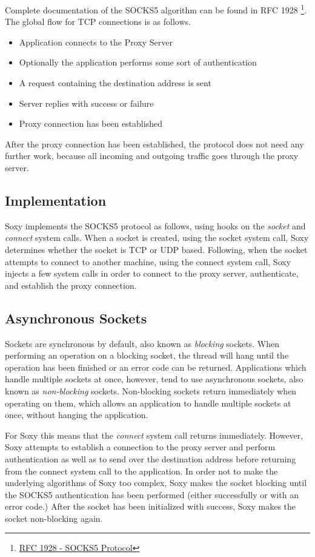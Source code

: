 \documentclass[a4paper, 10pt]{report}
\begin{document}
Complete documentation of the SOCKS5 algorithm can be found in
RFC 1928 \footnote{\href{http://www.ietf.org/rfc/rfc1928.txt}
{RFC 1928 - SOCKS5 Protocol}}. The global flow for TCP connections
is as follows.

\begin{itemize}
\item Application connects to the Proxy Server
\item Optionally the application performs some sort of authentication
\item A request containing the destination address is sent
\item Server replies with success or failure
\item Proxy connection has been established
\end{itemize}

After the proxy connection has been established, the protocol does not need
any further work, because all incoming and outgoing traffic goes through the
proxy server.

\subsection{Implementation}

Soxy implements the SOCKS5 protocol as follows, using hooks on the
\textit{socket} and \textit{connect} system calls. When a
socket is created, using the socket system call, Soxy determines whether the
socket is TCP or UDP based. Following, when the socket attempts to connect to
another machine, using the connect system call, Soxy injects a few system
calls in order to connect to the proxy server, authenticate, and establish the
proxy connection.

\subsection{Asynchronous Sockets}

Sockets are synchronous by default, also known as \textit{blocking} sockets.
When performing an operation on a blocking socket, the thread will hang until
the operation has been finished or an error code can be returned. Applications
which handle multiple sockets at once, however, tend to use asynchronous
sockets, also known as \textit{non-blocking} sockets. Non-blocking sockets
return immediately when operating on them, which allows an application to
handle multiple sockets at once, without hanging the application.

For Soxy this means that the \textit{connect} system call returns immediately.
However, Soxy attempts to establish a connection to the proxy server and
perform authentication as well as to send over the destination address before
returning from the connect system call to the application. In order not to
make the underlying algorithms of Soxy too complex, Soxy makes the socket
blocking until the SOCKS5 authentication has been performed (either
successfully or with an error code.) After the socket has been initialized
with success, Soxy makes the socket non-blocking again.
\end{document}
